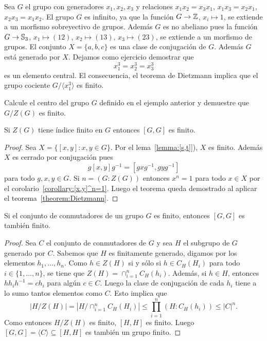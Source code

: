 \begin{example}
Sea $G$ el grupo con generadores $x_1,x_2,x_3$ y relaciones $x_1x_2=x_3x_1$, $x_1x_3=x_2x_1$, $x_2x_3=x_1x_2$. 
El grupo $G$ es infinito, ya que la función 
$G\to\mathbb{Z}$, $x_i\mapsto 1$, se extiende a un morfismo sobreyectivo de grupos. Además $G$ es no abeliano
pues la función $G\to\mathbb{S}_3$, $x_1\mapsto (12)$, $x_2\mapsto (13)$, $x_3\mapsto (23)$, se extiende a un morfismo
de grupos. 
El conjunto
$X=\{a,b,c\}$ es una clase de conjugación de $G$. Además $G$ está generado por $X$. 
Dejamos como ejercicio demostrar que 
\[
x_1^3=x_2^3=x_3^3 
\]
es un elemento central. El consecuencia, el teorema de Dietzmann implica que
el grupo cociente $G/\langle x_1^3\rangle$ es finito. 
\end{example}

\begin{exercise}
Calcule el centro del grupo $G$ definido en el ejemplo anterior y demuestre que
$G/Z(G)$ es finito. 
\end{exercise}

\begin{theorem}[Schur]
	\label{theorem:Schur_commutador}
	Si $Z(G)$ tiene índice finito en $G$ entonces $[G,G]$ es finito.
\end{theorem}

\begin{proof}
	Sea $X=\{[x,y]:x,y\in G\}$. Por el lema~\ref{lemma:[s,t]}), $X$ es finito.
	Además $X$ es cerrado por conjugación pues
	\[
		g[x,y]g^{-1}=[gxg^{-1},gyg^{-1}]
	\]
	para todo $g,x,y\in G$. Si $n=(G:Z(G))$ entonces $x^n=1$ para todo $x\in X$
	por el corolario~\ref{corollary:[x,y]^n=1}. Luego el teorema queda demostrado 
	al aplicar el teorema~\ref{theorem:Dietzmann}.
\end{proof}

\begin{corollary}[Sury]
	Si el conjunto de conmutadores de un grupo $G$ es finito, entonces
	$[G,G]$ es también finito.
\end{corollary}

\begin{proof}
	Sea $C$ el conjunto de conmutadores de $G$ y sea $H$ el subgrupo de $G$
	generado por $C$. Sabemos que $H$ es finitamente generado, digamos por los elementos 
	$h_1,\dots,h_n$. Como $h\in Z(H)$ si y sólo si $h\in C_H(H_i)$ para todo
	$i\in\{1,\dots,n\}$, se tiene que $Z(H)=\cap_{i=1}^n C_H(h_i)$. Además, si
	$h\in H$, entonces $hh_ih^{-1}=ch_i$ para algún $c\in C$. Luego la clase de
	conjugación de cada $h_i$ tiene a lo sumo tantos elementos como $C$. Esto
	implica que
	\[
		|H/Z(H)|=|H/\cap_{i=1}^n C_H(H_i)|\leq\prod_{i=1}^n (H:C_H(h_i))\leq |C|^n.
	\]
	Como entonces $H/Z(H)$ es finito, $[H,H]$ es finito. Luego 
	$[G,G]=\langle C\rangle\subseteq [H,H]$ 
	es también un grupo finito.
\end{proof}

